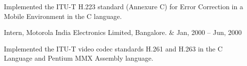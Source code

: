 \documentclass[letterpaper]{article}
\begin{document}
\begin{list1}
\begin{list2}
	\item Implemented the ITU-T H.223 standard (Annexure C) for Error Correction
	 in a Mobile Environment in the C language. 
   \end{list2}

  \item
   \begin{tabular1bold}
	Intern, Motorola India Electronics Limited, Bangalore. & Jan, 2000
	-- Jun, 2000\\
   \end{tabular1bold}

   \begin{list2}
	\item Implemented the ITU-T video codec standards H.261 and
	 H.263 in the C Language and Pentium MMX Assembly language. 
   \end{list2}

\end{list1}
\end{document}
